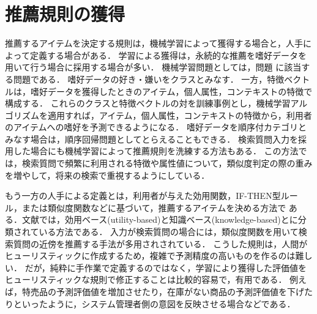 \section{推薦規則の獲得}
\label{sec:cbfrule}

推薦するアイテムを決定する規則は，機械学習によって獲得する場合と，人手によって定義する場合がある．
学習による獲得は，永続的な推薦を嗜好データを用いて行う場合に採用する場合が多い．
機械学習問題としては，問題\cite{e:0028,jpublist:077x,trieice:06:04}
に該当する問題である．
嗜好データの好き・嫌いをクラスとみなす．
一方，特徴ベクトルは，嗜好データを獲得したときのアイテム，個人属性，コンテキストの特徴で構成する．
これらのクラスと特徴ベクトルの対を訓練事例とし，機械学習アルゴリズムを適用すれば，アイテム，個人属性，コンテキストの特徴から，利用者のアイテムへの嗜好を予測できるようになる．
嗜好データを順序付カテゴリとみなす場合は，順序回帰問題\cite{jb:025:00}としてとらえることもできる．
検索質問入力を採用した場合にも機械学習によって推薦規則を洗練する方法もある\cite{jair:04:01}．
この方法では，検索質問で頻繁に利用される特徴や属性値について，類似度判定の際の重みを増やして，将来の検索で重視するようにしている．

もう一方の人手による定義とは，利用者が与えた効用関数，IF-THEN型ルール，または類似度関数などに基づいて，推薦するアイテムを決める方法で
ある．文献\cite{ej:048}では，効用ベース(utility-based)と知識ベース(knowledge-based)とに分類されている方法である．
入力が検索質問の場合には，類似度関数を用いて検索質問の近傍を推薦する手法が多用されされている．
こうした規則は，人間がヒューリスティックに作成するため，複雑で予測精度の高いものを作るのは難しい．
だが，純粋に手作業で定義するのではなく，学習により獲得した評価値をヒューリスティックな規則で修正することは比較的容易で，有用である．
例えば，特売品の予測評価値を増加させたり，在庫がない商品の予測評価値を下げたりといったように，システム管理者側の意図を反映させる場合などである．
